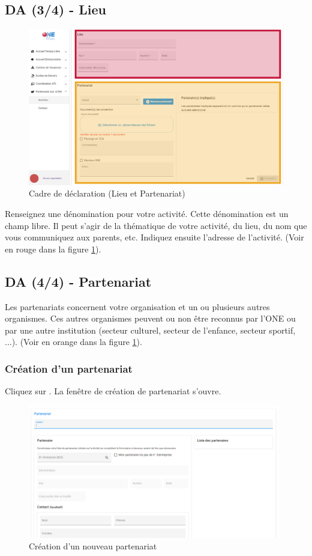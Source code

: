 \subsection{DA (3/4) - Lieu}
\begin{figure}[h!]
    \centering
    \includegraphics[width=13cm]{Images/pad/da2.png}
    \caption{Cadre de déclaration (Lieu et Partenariat)}
    \label{fig:pad_da2}
\end{figure}
Renseignez une dénomination pour votre activité. Cette dénomination est un champ libre. Il peut s'agir de la thématique de votre activité, du lieu, du nom que vous communiquez aux parents, etc.  Indiquez ensuite l'adresse de l'activité. (Voir en rouge dans la figure \ref{fig:pad_da2}). 

\subsection{DA (4/4) - Partenariat}
Les partenariats concernent votre organisation et un ou plusieurs autres organismes. Ces autres organismes peuvent ou non être reconnus par l'ONE ou par une autre institution (secteur culturel, secteur de l'enfance, secteur sportif, ...). (Voir en orange dans la figure \ref{fig:pad_da2}). 


\subsubsection{Création d'un partenariat}
Cliquez sur . La fenêtre de création de partenariat s'ouvre. 

\begin{figure}[h!]
    \centering
    \includegraphics[width=11cm]{Images/pad/new-partenariat.png}
    \caption{Création d'un nouveau partenariat}
    \label{fig:pad_da_nouveau_partenariat}
\end{figure}



